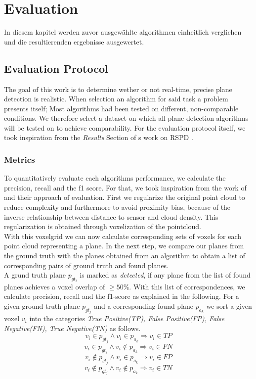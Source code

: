 \documentclass[main.tex]{subfiles}
\begin{document}
\chapter{Evaluation}

In diesem kapitel werden zuvor ausgewählte algorithmen einheitlich verglichen und die resultierenden ergebnisse ausgewertet.

\section{Evaluation Protocol}
The goal of this work is to determine wether or not real-time, precise plane detection is realistic.
When selection an algorithm for said task a problem presents itself; Most algorithms had been tested on different, non-comparable conditions.
We therefore select a dataset on which all plane detection algorithms will be tested on to achieve comparability.
For the evaluation protocol itself, we took inspiration from the \textit{Results} Section of \citeauthor{Araújo_Oliveira_2020}s work on RSPD \cite{Araújo_Oliveira_2020}.  


\subsection{Metrics}
To quantitatively evaluate each algorithms performance, we calculate the precision, recall and the f1 score.
For that, we took inspiration from the work of \cite{Araújo_Oliveira_2020} and their approach of evaluation. 
First we regularize the original point cloud to reduce complexity and furthermore to avoid proximity bias, because of the inverse relationship
between distance to sensor and cloud density. This regularization is obtained through voxelization of the pointcloud.\\
With this voxelgrid we can now calculate corresponding sets of voxels for each point cloud representing a plane.
In the next step, we compare our planes from the ground truth with the planes obtained from an algorithm to obtain a list of corresponding pairs
of ground truth and found planes.\\
A grund truth plane $p_{gt_i}$ is marked as \textit{detected}, if any plane from the list of found planes achieves a voxel overlap of $\geq 50\%$.
With this list of correspondences, we calculate precision, recall and the f1-score as explained in the following.
For a given ground truth plane $p_{gt_j}$ and a corresponding found plane $p_{a_k}$ we sort a given voxel $v_i$ into the categories 
\textit{True Positive(TP), False Positive(FP), False Negative(FN), True Negative(TN)} as follows.
$$v_i \in p_{gt_j} \land v_i \in p_{a_k} \Rightarrow v_{i} \in TP$$
$$v_i \in p_{gt_j} \land v_i \notin p_{a_k} \Rightarrow v_{i} \in FN$$
$$v_i \notin p_{gt_j} \land v_i \in p_{a_k} \Rightarrow v_{i} \in FP$$
$$v_i \notin p_{gt_j} \land v_i \notin p_{a_k} \Rightarrow v_{i} \in TN$$
\end{document}
